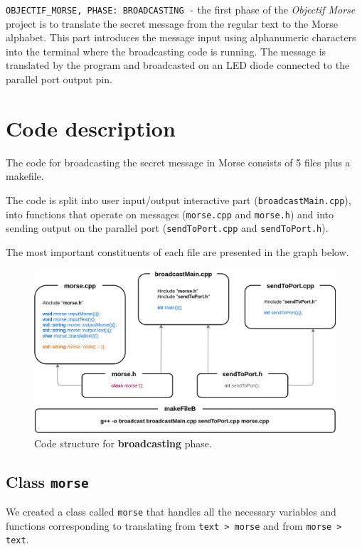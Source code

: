\documentclass[12pt]{report}
\begin{document}
\verb|OBJECTIF_MORSE, PHASE: BROADCASTING -| the first phase of the \textit{Objectif Morse} project is to translate the secret message from the regular text to the Morse alphabet. This part introduces the message input using alphanumeric characters into the terminal where the broadcasting code is running. The message is translated by the program and broadcasted on an LED diode connected to the parallel port output pin.

\section{Code description}

The code for broadcasting the secret message in Morse consists of 5 files plus a makefile.

The code is split into user input/output interactive part (\verb|broadcastMain.cpp|), into functions that operate on messages (\verb|morse.cpp| and \verb|morse.h|) and into sending output on the parallel port (\verb|sendToPort.cpp| and \verb|sendToPort.h|).

The most important constituents of each file are presented in the graph below.

\begin{figure}[H]
\centering\includegraphics[width=15cm]{bCodeStructure}
\caption{Code structure for \textbf{broadcasting} phase.}				
\label{fig:br_code}
\end{figure}

\subsection{Class \texttt{morse}}

We created a class called \verb|morse| that handles all the necessary variables and functions corresponding to translating from \verb|text > morse| and from \verb|morse > text|.
\end{document}
